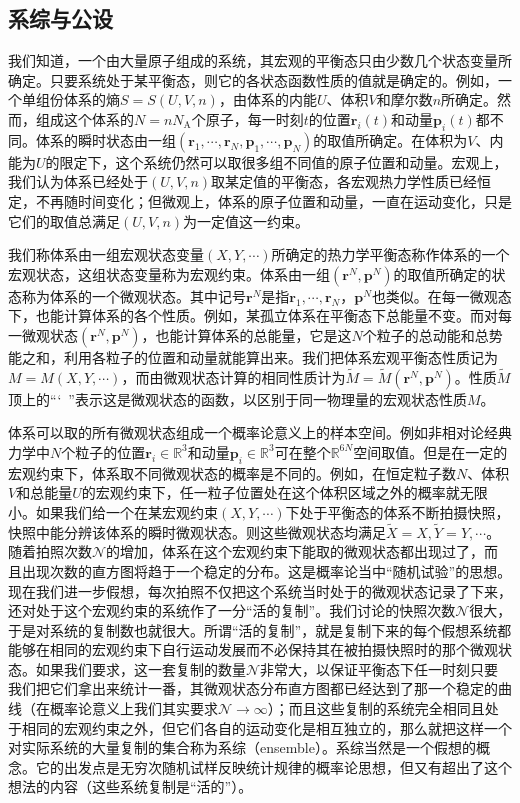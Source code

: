 \documentclass[main.tex]{subfiles}
\begin{document}
\subsection{系综与公设}
我们知道，一个由大量原子组成的系统，其宏观的平衡态只由少数几个状态变量所确定。只要系统处于某平衡态，则它的各状态函数性质的值就是确定的。例如，一个单组份体系的熵$S=S\left(U,V,n\right)$，由体系的内能$U$、体积$V$和摩尔数$n$所确定。然而，组成这个体系的$N=nN_\text{A}$个原子，每一时刻$t$的位置$\mathbf{r}_i\left(t\right)$和动量$\mathbf{p}_i\left(t\right)$都不同。体系的瞬时状态由一组$\left(\mathbf{r}_1,\cdots,\mathbf{r}_N,\mathbf{p}_1,\cdots,\mathbf{p}_N\right)$的取值所确定。在体积为$V$、内能为$U$的限定下，这个系统仍然可以取很多组不同值的原子位置和动量。宏观上，我们认为体系已经处于$\left(U,V,n\right)$取某定值的平衡态，各宏观热力学性质已经恒定，不再随时间变化；但微观上，体系的原子位置和动量，一直在运动变化，只是它们的取值总满足$\left(U,V,n\right)$为一定值这一约束。

我们称体系由一组宏观状态变量$\left(X,Y,\cdots\right)$所确定的热力学平衡态称作体系的一个宏观状态，这组状态变量称为宏观约束。体系由一组$\left(\mathbf{r}^N,\mathbf{p}^N\right)$的取值所确定的状态称为体系的一个微观状态。其中记号$\mathbf{r}^N$是指$\mathbf{r}_1,\cdots,\mathbf{r}_N$，$\mathbf{p}^N$也类似。在每一微观态下，也能计算体系的各个性质。例如，某孤立体系在平衡态下总能量不变。而对每一微观状态$\left(\mathbf{r}^N,\mathbf{p}^N\right)$，也能计算体系的总能量，它是这$N$个粒子的总动能和总势能之和，利用各粒子的位置和动量就能算出来。我们把体系宏观平衡态性质记为$M=M\left(X,Y,\cdots\right)$，而由微观状态计算的相同性质计为$\tilde{M}=\tilde{M}\left(\mathbf{r}^N,\mathbf{p}^N\right)$。性质$\tilde{M}$顶上的“\char`~”表示这是微观状态的函数，以区别于同一物理量的宏观状态性质$M$。

体系可以取的所有微观状态组成一个概率论意义上的样本空间。例如非相对论经典力学中$N$个粒子的位置$\mathbf{r}_i\in\mathbb{R}^3$和动量$\mathbf{p}_i\in\mathbb{R}^3$可在整个$\mathbb{R}^{6N}$空间取值。但是在一定的宏观约束下，体系取不同微观状态的概率是不同的。例如，在恒定粒子数$N$、体积$V$和总能量$U$的宏观约束下，任一粒子位置处在这个体积区域之外的概率就无限小。如果我们给一个在某宏观约束$\left(X,Y,\cdots\right)$下处于平衡态的体系不断拍摄快照，快照中能分辨该体系的瞬时微观状态。则这些微观状态均满足$\tilde{X}=X,\tilde{Y}=Y,\cdots$。随着拍照次数$\mathcal{N}$的增加，体系在这个宏观约束下能取的微观状态都出现过了，而且出现次数的直方图将趋于一个稳定的分布。这是概率论当中“随机试验”的思想。现在我们进一步假想，每次拍照不仅把这个系统当时处于的微观状态记录了下来，还对处于这个宏观约束的系统作了一分“活的复制”。我们讨论的快照次数$\mathcal{N}$很大，于是对系统的复制数也就很大。所谓“活的复制”，就是复制下来的每个假想系统都能够在相同的宏观约束下自行运动发展而不必保持其在被拍摄快照时的那个微观状态。如果我们要求，这一套复制的数量$\mathcal{N}$非常大，以保证平衡态下任一时刻只要我们把它们拿出来统计一番，其微观状态分布直方图都已经达到了那一个稳定的曲线（在概率论意义上我们其实要求$\mathcal{N}\rightarrow\infty$）；而且这些复制的系统完全相同且处于相同的宏观约束之外，但它们各自的运动变化是相互独立的，那么就把这样一个对实际系统的大量复制的集合称为系综（ensemble）。系综当然是一个假想的概念。它的出发点是无穷次随机试样反映统计规律的概率论思想，但又有超出了这个想法的内容（这些系统复制是“活的”）。
\end{document}
